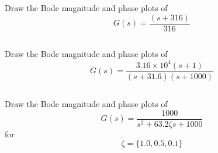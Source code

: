 \documentclass{article}	%
\begin{document}


\subsection{}

Draw the Bode magnitude and phase plots of
\[
G(s) = \frac{(s+316)}{316}
\]


%
%
%
%
%
%



\subsection{}
Draw the Bode magnitude and phase plots of
\[
G(s) = \frac{3.16\times10^4(s+1)}{(s+31.6)(s+1000)}
\]

%
%
%
%






\subsection{}
Draw the Bode magnitude and phase plots of
\[
G(s) = \frac{1000}{s^2 + 63.2\zeta s + 1000}
\]
for
\[
\zeta = \{1.0, 0.5, 0.1\}
\]
\end{document}
